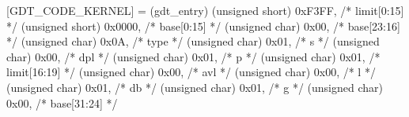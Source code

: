     [GDT_CODE_KERNEL] = (gdt_entry) {
        (unsigned short)    0xF3FF,         /* limit[0:15]  */
        (unsigned short)    0x0000,         /* base[0:15]   */
        (unsigned char)     0x00,           /* base[23:16]  */
        (unsigned char)     0x0A,           /* type         */
        (unsigned char)     0x01,           /* s            */
        (unsigned char)     0x00,           /* dpl          */
        (unsigned char)     0x01,           /* p            */
        (unsigned char)     0x01,           /* limit[16:19] */
        (unsigned char)     0x00,           /* avl          */
        (unsigned char)     0x00,           /* l            */
        (unsigned char)     0x01,           /* db           */
        (unsigned char)     0x01,           /* g            */
        (unsigned char)     0x00,           /* base[31:24]  */
    }